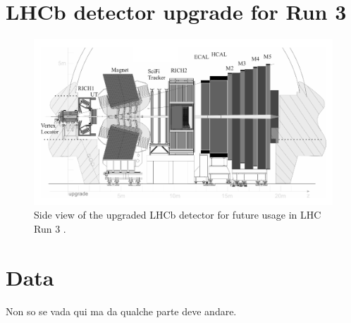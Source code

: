 \section{LHCb detector upgrade for Run 3}

\begin{figure}[t]
	\centering
	\includegraphics[width=\textwidth]{graphics/02-lhcb/lhcb_diagram_run3.png}
	\caption[LHCb detector side view.]{Side view of the upgraded LHCb detector for future usage in LHC Run 3 \cite{Piucci_2017}.}
	\label{fig:2:lhcb_diagram_run3}
\end{figure}

\section{Data}
Non so se vada qui ma da qualche parte deve andare.